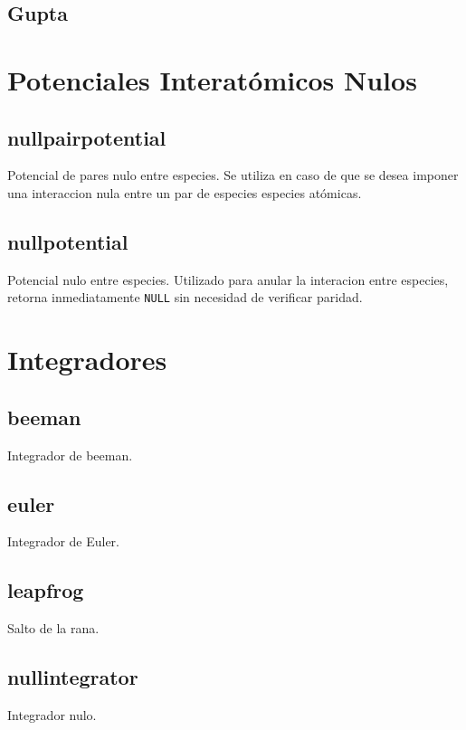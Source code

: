 
\subsection{Gupta}

\section{Potenciales Interat\'omicos Nulos}
\subsection{nullpairpotential}
Potencial de pares nulo entre especies. Se utiliza en caso de que se desea imponer una interaccion nula entre un par de especies especies at\'omicas. 
\subsection{nullpotential}
Potencial nulo entre especies. Utilizado para anular la interacion entre especies, retorna inmediatamente \verb|NULL| sin necesidad de verificar paridad.

\section{Integradores}
\subsection{beeman}
Integrador de beeman.
\subsection{euler}
Integrador de Euler.
\subsection{leapfrog}
Salto de la rana.
\subsection{nullintegrator}
Integrador nulo.

